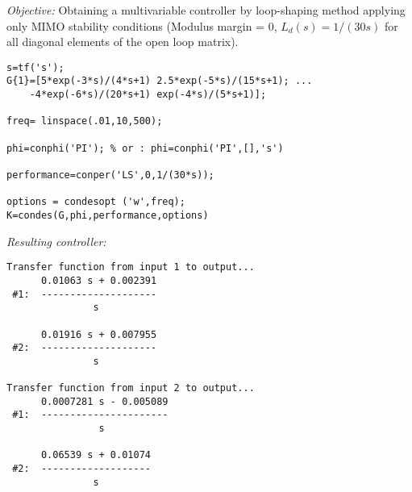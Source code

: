 \documentclass [12pt , a4paper] {article}
\begin{document}
\emph{Objective:} Obtaining a multivariable controller by loop-shaping method applying only MIMO stability conditions (Modulus margin = 0, $L_d(s)=1/(30s)$ for all diagonal elements of the open loop matrix).

\begin{lstlisting}
s=tf('s');
G{1}=[5*exp(-3*s)/(4*s+1) 2.5*exp(-5*s)/(15*s+1); ...
    -4*exp(-6*s)/(20*s+1) exp(-4*s)/(5*s+1)];

freq= linspace(.01,10,500);

phi=conphi('PI'); % or : phi=conphi('PI',[],'s')

performance=conper('LS',0,1/(30*s)); 

options = condesopt ('w',freq);
K=condes(G,phi,performance,options)
\end{lstlisting}

\emph{Resulting controller:}

\begin{lstlisting}
Transfer function from input 1 to output...
      0.01063 s + 0.002391
 #1:  --------------------
               s
 
      0.01916 s + 0.007955
 #2:  --------------------
               s
 
Transfer function from input 2 to output...
      0.0007281 s - 0.005089
 #1:  ----------------------
                s
 
      0.06539 s + 0.01074
 #2:  -------------------
               s
\end{lstlisting}







\end{document}
